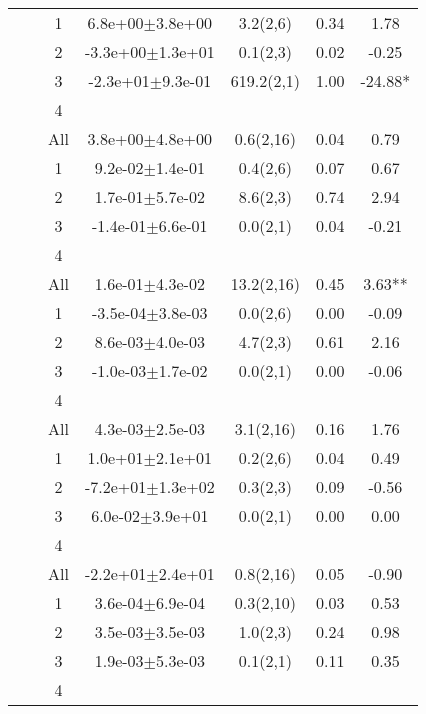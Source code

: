 \begin{longtable}{llccccS[table-format=-2.2, table-space-text-post = {***}]}
   \midrule
{} & {} & 1 &  6.8e+00$\pm$3.8e+00 & 3.2(2,6) & 0.34 & 1.78 \\ 
   &  & 2 & -3.3e+00$\pm$1.3e+01 & 0.1(2,3) & 0.02 & -0.25 \\ 
   &  & 3 & -2.3e+01$\pm$9.3e-01 & 619.2(2,1) & 1.00 & -24.88* \\ 
   &  & 4 &  &  &  &  \\ 
   &  & All &  3.8e+00$\pm$4.8e+00 & 0.6(2,16) & 0.04 & 0.79 \\ 
   \midrule
{} & {} & 1 &  9.2e-02$\pm$1.4e-01 & 0.4(2,6) & 0.07 & 0.67 \\ 
   &  & 2 &  1.7e-01$\pm$5.7e-02 & 8.6(2,3) & 0.74 & 2.94 \\ 
   &  & 3 & -1.4e-01$\pm$6.6e-01 & 0.0(2,1) & 0.04 & -0.21 \\ 
   &  & 4 &  &  &  &  \\ 
   &  & All &  1.6e-01$\pm$4.3e-02 & 13.2(2,16) & 0.45 & 3.63** \\ 
   \midrule
{} & {} & 1 & -3.5e-04$\pm$3.8e-03 & 0.0(2,6) & 0.00 & -0.09 \\ 
   &  & 2 &  8.6e-03$\pm$4.0e-03 & 4.7(2,3) & 0.61 & 2.16 \\ 
   &  & 3 & -1.0e-03$\pm$1.7e-02 & 0.0(2,1) & 0.00 & -0.06 \\ 
   &  & 4 &  &  &  &  \\ 
   &  & All &  4.3e-03$\pm$2.5e-03 & 3.1(2,16) & 0.16 & 1.76 \\ 
   \midrule
{} & {} & 1 &  1.0e+01$\pm$2.1e+01 & 0.2(2,6) & 0.04 & 0.49 \\ 
   &  & 2 & -7.2e+01$\pm$1.3e+02 & 0.3(2,3) & 0.09 & -0.56 \\ 
   &  & 3 &  6.0e-02$\pm$3.9e+01 & 0.0(2,1) & 0.00 & 0.00 \\ 
   &  & 4 &  &  &  &  \\ 
   &  & All & -2.2e+01$\pm$2.4e+01 & 0.8(2,16) & 0.05 & -0.90 \\ 
   \midrule
{} & {} & 1 &  3.6e-04$\pm$6.9e-04 & 0.3(2,10) & 0.03 & 0.53 \\ 
   &  & 2 &  3.5e-03$\pm$3.5e-03 & 1.0(2,3) & 0.24 & 0.98 \\ 
   &  & 3 &  1.9e-03$\pm$5.3e-03 & 0.1(2,1) & 0.11 & 0.35 \\ 
   &  & 4 &  &  &  &  \\ 

\end{longtable}
